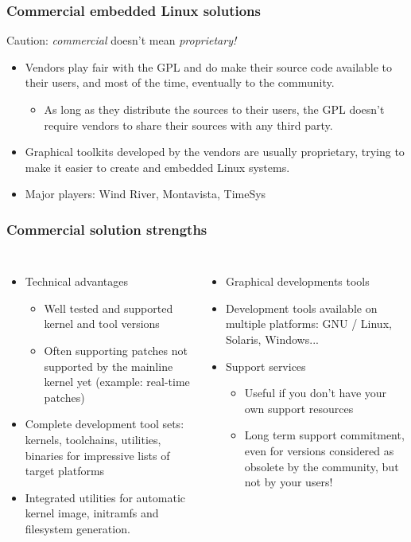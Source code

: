 \begin{frame}
  \frametitle{Commercial embedded Linux solutions}
  Caution: {\em commercial} doesn't mean {\em proprietary!}
  \begin{itemize}
  \item Vendors play fair with the GPL and do make their source code
    available to their users, and most of the time, eventually to the
    community.
    \begin{itemize}
    \item As long as they distribute the sources to their users, the
      GPL doesn't require vendors to share their sources with any
      third party.
    \end{itemize}
  \item Graphical toolkits developed by the vendors are usually
    proprietary, trying to make it easier to create and embedded Linux
    systems.
  \item Major players: Wind River, Montavista, TimeSys
  \end{itemize}
\end{frame}

\begin{frame}
  \frametitle{Commercial solution strengths}
  \begin{columns}
    \begin{itemize}
    \item Technical advantages
      \begin{itemize}
      \item Well tested and supported kernel and tool versions
      \item Often supporting patches not supported by the
        mainline kernel yet (example: real-time patches)
      \end{itemize}
    \item Complete development tool sets: kernels, toolchains,
      utilities, binaries for impressive lists of target platforms
    \item Integrated utilities for automatic kernel image, initramfs
      and filesystem generation.
    \end{itemize}
    \begin{itemize}
    \item Graphical developments tools
    \item Development tools available on multiple platforms: GNU /
      Linux, Solaris, Windows...
    \item Support services
      \begin{itemize}
      \item Useful if you don't have your own support resources
      \item Long term support commitment, even for versions considered
        as obsolete by the community, but not by your users!
      \end{itemize}
    \end{itemize}
  \end{columns}
\end{frame}

